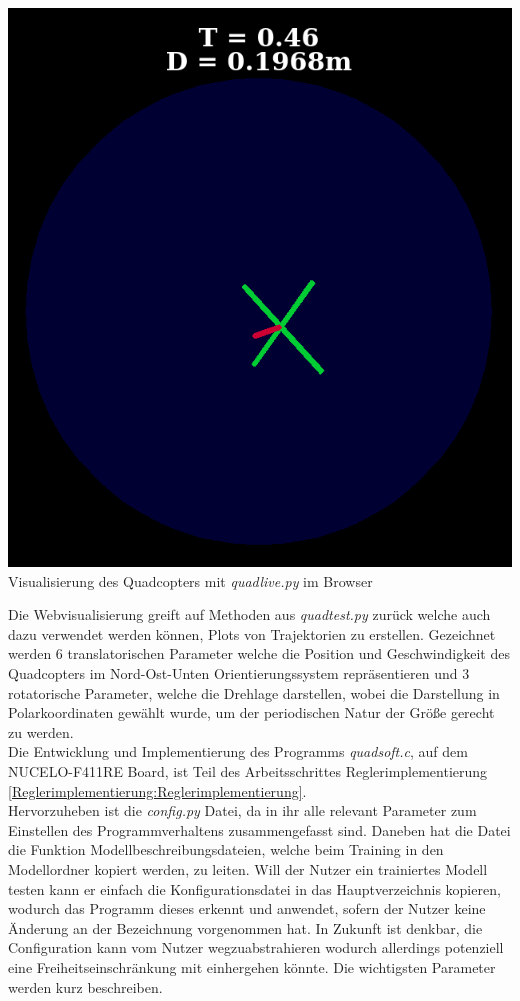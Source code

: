 \begin{center}
	\includegraphics[scale=0.3]{../images/0068 Quadlive 1.png}{\\Visualisierung des Quadcopters mit \textit{quadlive.py} im Browser}
\end{center}
Die Webvisualisierung greift auf Methoden aus \textit{quadtest.py} zurück welche auch dazu verwendet werden können, Plots von Trajektorien zu erstellen. Gezeichnet werden 6 translatorischen Parameter welche die Position und Geschwindigkeit des Quadcopters im Nord-Ost-Unten Orientierungssystem repräsentieren und 3 rotatorische Parameter, welche die Drehlage darstellen, wobei die Darstellung in Polarkoordinaten gewählt wurde, um der periodischen Natur der Größe gerecht zu werden.\\
Die Entwicklung und Implementierung des Programms \textit{quadsoft.c}, auf dem NUCELO-F411RE Board, ist Teil des Arbeitsschrittes Reglerimplementierung \ref{Reglerimplementierung:Reglerimplementierung}.\\
Hervorzuheben ist die \textit{config.py} Datei, da in ihr alle relevant Parameter zum Einstellen des Programmverhaltens zusammengefasst sind. Daneben hat die Datei die Funktion Modellbeschreibungsdateien, welche beim Training in den Modellordner kopiert werden, zu leiten. Will der Nutzer ein trainiertes Modell testen kann er einfach die Konfigurationsdatei in das Hauptverzeichnis kopieren, wodurch das Programm dieses erkennt und anwendet, sofern der Nutzer keine Änderung an der Bezeichnung vorgenommen hat. In Zukunft ist denkbar, die Configuration kann vom Nutzer wegzuabstrahieren wodurch allerdings potenziell eine Freiheitseinschränkung mit einhergehen könnte. Die wichtigsten Parameter werden kurz beschreiben.
